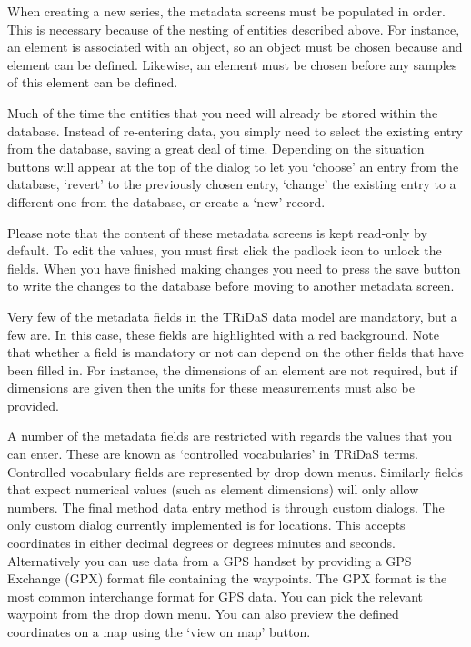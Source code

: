 When creating a new series, the metadata screens must be populated in order.  This is necessary because of the nesting of entities described above.  For instance, an element is associated with an object, so an object must be chosen because and element can be defined.  Likewise, an element must be chosen before any samples of this element can be defined.  

Much of the time the entities that you need will already be stored within the database.  Instead of re-entering data, you simply need to select the existing entry from the database, saving a great deal of time.  Depending on the situation buttons will appear at the top of the dialog to let you `choose' an entry from the database, `revert' to the previously chosen entry, `change' the existing entry to a different one from the database, or create a `new' record.

Please note that the content of these metadata screens is kept read-only by default.  To edit the values, you must first click the padlock icon to unlock the fields.  When you have finished making changes you need to press the save button to write the changes to the database before moving to another metadata screen.

Very few of the metadata fields in the TRiDaS data model are mandatory, but a few are.  In this case, these fields are highlighted with a red background.  Note that whether a field is mandatory or not can depend on the other fields that have been filled in.  For instance, the dimensions of an element are not required, but if dimensions are given then the units for these measurements must also be provided.

A number of the metadata fields are restricted with regards the values that you can enter.  These are known as `controlled vocabularies' in TRiDaS terms.  Controlled vocabulary fields are represented by drop down menus.  Similarly fields that expect numerical values (such as element dimensions) will only allow numbers.  The final method data entry method is through custom dialogs.  The only custom dialog currently implemented is for locations.  This accepts coordinates in either decimal degrees or degrees minutes and seconds.  Alternatively you can use data from a GPS handset by providing a GPS Exchange (GPX) format file containing the waypoints. The GPX format is the most common interchange format for GPS data. You can pick the relevant waypoint from the drop down menu.  You can also preview the defined coordinates on a map using the `view on map' button. 


